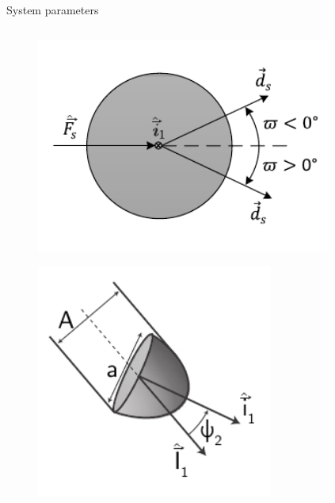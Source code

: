 \documentclass{beamer}
\begin{document}
\begin{frame}{System parameters}
 \begin{columns}[T]
		\begin{column}{0.45\textwidth}
			\begin{figure}[ht]\centering
				\includegraphics[width=1\textwidth]{images/Drawing_bitwalk.pdf}
			\end{figure}
			\begin{figure}[ht]\centering
			\vspace{-1cm}	\includegraphics[width=0.8\textwidth]{images/Overgauge.pdf}
			\end{figure}
		\end{column}
		\begin{column}{0.5\textwidth}\setlength{\leftmargini}{0pt}

\end{column}
\end{columns}
\end{frame}
\end{document}
